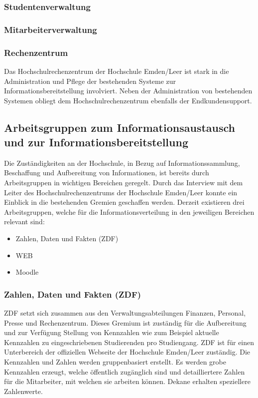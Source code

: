 \subsubsection{Studentenverwaltung}
\subsubsection{Mitarbeiterverwaltung}
\subsubsection{Rechenzentrum}
Das Hochschulrechenzentrum der Hochschule Emden/Leer ist stark in die Administration und Pflege der bestehenden Systeme zur Informationsbereitstellung involviert. Neben der Administration von bestehenden Systemen obliegt dem Hochschulrechenzentrum ebenfalls der Endkundensupport.

\subsection{Arbeitsgruppen zum Informationsaustausch und zur Informationsbereitstellung}
\label{subsection_arbeitsgruppen_informationsaustausch}
Die Zuständigkeiten an der Hochschule, in Bezug auf Informationssammlung, Beschaffung und Aufbereitung von Informationen, ist bereits durch Arbeitsgruppen in wichtigen Bereichen geregelt. Durch das Interview mit dem Leiter des Hochschulrechenzentrums der Hochschule Emden/Leer konnte ein Einblick in die bestehenden Gremien geschaffen werden. Derzeit existieren drei Arbeitsgruppen, welche für die Informationsverteilung in den jeweiligen Bereichen relevant sind:

\begin{itemize}
	\item Zahlen, Daten und Fakten (ZDF)
	\item WEB
	\item Moodle
\end{itemize}

\subsubsection{Zahlen, Daten und Fakten (ZDF)}
ZDF setzt sich zusammen aus den Verwaltungsabteilungen Finanzen, Personal, Presse und Rechenzentrum. Dieses Gremium ist zuständig für die Aufbereitung und zur Verfügung Stellung von Kennzahlen wie zum Beispiel aktuelle Kennzahlen zu eingeschriebenen Studierenden pro Studiengang.  ZDF ist für einen Unterbereich der offiziellen Webseite der Hochschule Emden/Leer zuständig. Die Kennzahlen und Zahlen werden gruppenbasiert erstellt. Es werden grobe Kennzahlen erzeugt, welche öffentlich zugänglich sind und detailliertere Zahlen für die Mitarbeiter, mit welchen sie arbeiten können. Dekane erhalten speziellere Zahlenwerte.

